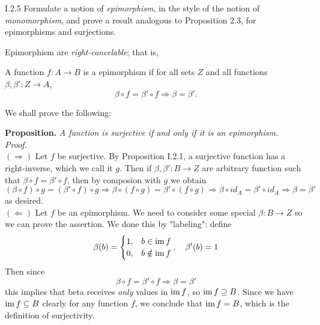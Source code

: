 \begin{problem}{I.2.5}
Formulate a notion of \emph{epimorphism}, in the style of the notion of \emph{monomorphism}, and prove a result analogous to Proposition 2.3, for epimorphisms and surjections.
\end{problem}
\begin{sol}
Epimorphism are \emph{right-cancelable}; that is,
\begin{center}
A function $f : A \to B$ is a epimorphism if for all sets $Z$ and all functions $\beta, \beta' : Z \to A$, 
\[
\beta \circ f = \beta' \circ f \Longrightarrow \beta = \beta'.
\]
\end{center}
We shall prove the following:

\noindent \textbf{Proposition. }\textit{A function is surjective if and only if it is an epimorphism.} \\
\textit{Proof. } \\
$(\Rightarrow)$ Let $f$ be surjective. By Proposition I.2.1, a surjective function has a right-inverse, which we call it $g$. Then if $\beta, \beta' : B \to Z$ are arbitrary function such that $\beta \circ f = \beta' \circ f$, then by composion with $g$ we obtain
\[
(\beta \circ f) \circ g=  (\beta' \circ f) \circ g \Rightarrow \beta \circ (f \circ g)=  \beta' \circ  (f \circ g) \Rightarrow \beta \circ id_A = \beta' \circ id_A \Rightarrow \beta = \beta'
\]
as desired. \\
$(\Leftarrow)$ Let $f$ be an epimorphism. We need to consider some special $\beta:B \to Z$ so we can prove the assertion. We done this by "labeling": define
\[
\beta(b) = \begin{cases}
    1, &b \in \operatorname{im} f \\
    0, &b \notin \operatorname{im} f
\end{cases}, \quad \beta'(b) = 1
\]
Then since 
\[
\beta \circ f = \beta' \circ f  \Rightarrow \beta = \beta'
\] 
this implies that beta receives \emph{only} values in $\operatorname{im} f$, so $\operatorname{im} f \supseteq B$. Since we have $\operatorname{im} f \subseteq B$ clearly for any function $f$, we conclude that $\operatorname{im} f = B$, which is the definition of surjectivity.
\end{sol}

